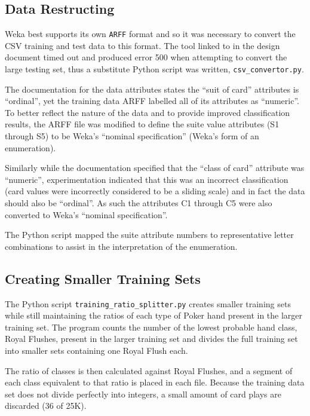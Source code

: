 \documentclass[10pt, a4paper]{article}
\begin{document}
\subsection*{Data Restructing}

Weka best supports its own \texttt{ARFF} format and so it was necessary to convert the CSV training \cite{trainingdata} and test \cite{testdata} data to this format. The tool linked to in the design document \cite{arffconv} timed out and produced error 500 when attempting to convert the large testing set, thus a substitute Python script was written, \texttt{csv\_convertor.py}.

The documentation for the data attributes \cite{expattr} states the ``suit of card'' attributes is ``ordinal'', yet the training data ARFF labelled all of its attributes as ``numeric''. To better reflect the nature of the data and to provide improved classification results, the ARFF file was modified to define the suite value attributes (S1 through S5) to be Weka's ``nominal specification'' (Weka's form of an enumeration).

Similarly while the documentation specified that the ``class of card'' attribute was ``numeric'', experimentation indicated that this was an incorrect classification (card values were incorrectly considered to be a sliding scale) and in fact the data should also be ``ordinal''. As such the attributes C1 through C5 were also converted to Weka's ``nominal specification''.

The Python script mapped the suite attribute numbers to representative letter combinations to assist in the interpretation of the enumeration.

\subsection*{Creating Smaller Training Sets}

The Python script \texttt{training\_ratio\_splitter.py} creates smaller training sets while still maintaining the ratios of each type of Poker hand present in the larger training set. The program counts the number of the lowest probable hand class, Royal Flushes,  present in the larger training set and divides the full training set into smaller sets containing one Royal Flush each.

The ratio of classes is then calculated against Royal Flushes, and a segment of each class equivalent to that ratio is placed in each file. Because the training data set does not divide perfectly into integers, a small amount of card plays are discarded (36 of 25K). 
\end{document}
